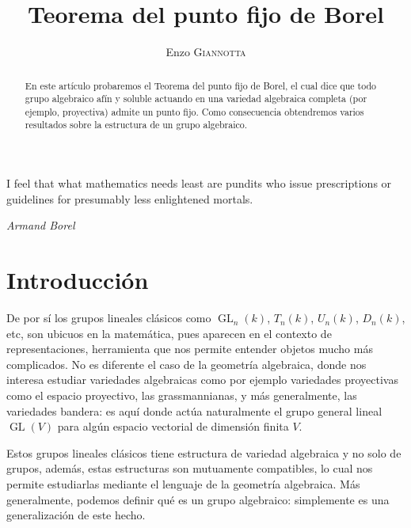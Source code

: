 \documentclass[spanish,12pt]{amsart}
\theoremstyle{definition}
\theoremstyle{remark}
\numberwithin{equation}{section}
\newcommand{\fiveknot}{%
\begin{tikzpicture}[transform canvas={scale=0.1}]
\begin{knot}[
  consider self intersections=true,
  flip crossing/.list={2,4},
  only when rendering/.style={
  }
]
\strand[black, line width=8pt] (2,0) .. controls +(0,1) and +(54:1.0) .. (144:2) .. controls +(54:-1.0) and +(18:-1.0) .. (-72:2) .. controls +(18:1.0) and +(162:-1.0) .. (72:2) .. controls +(162:1.0) and +(126:1.0) .. (-144:2) .. controls +(126:-1.0) and +(0,-1.0) .. (2,0);
\end{knot}
\end{tikzpicture}
}
\begin{document}
\renewcommand{\qedsymbol}{\fiveknot}

\title{Teorema del punto fijo de Borel}

\author{Enzo \textsc{Giannotta}}





\begin{abstract}
En este artículo probaremos el Teorema del punto fijo de Borel, el cual dice que todo grupo algebraico afín y soluble actuando en una variedad algebraica completa (por ejemplo, proyectiva) admite un punto fijo. Como consecuencia obtendremos varios resultados sobre la estructura de un grupo algebraico.
\end{abstract}

\maketitle

\tableofcontents

\epigraph{I feel that what mathematics needs least are pundits who issue prescriptions or guidelines for presumably less enlightened mortals.}{\textit{Armand Borel}}

\section{Introducción}


De por sí los grupos lineales clásicos como $\operatorname{GL}_n (k)$, $T_n (k)$, $U_n (k)$, $D_n (k)$, etc, son ubicuos en la matemática, pues aparecen en el contexto de representaciones, herramienta que nos permite entender objetos mucho más complicados. No es diferente el caso de la geometría algebraica, donde nos interesa estudiar variedades algebraicas como por ejemplo variedades proyectivas como el espacio proyectivo, las grassmannianas, y más generalmente, las variedades bandera: es aquí donde actúa naturalmente el grupo general lineal $\operatorname{GL} (V)$ para algún espacio vectorial de dimensión finita $V$.

Estos grupos lineales clásicos tiene estructura de variedad algebraica y no solo de grupos, además, estas estructuras son mutuamente compatibles, lo cual nos permite estudiarlas mediante el lenguaje de la geometría algebraica. Más generalmente, podemos definir qué es un grupo algebraico: simplemente es una generalización de este hecho.
\end{document}
